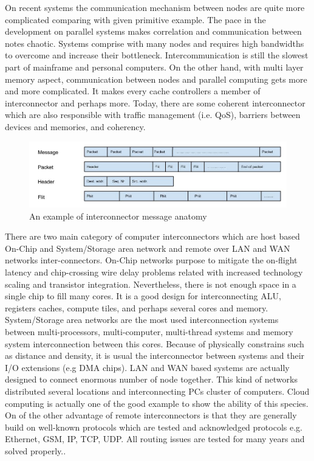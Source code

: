             On recent systems the communication mechanism between nodes are quite more complicated comparing with given primitive example. The pace in the development on parallel systems makes correlation and communication between notes chaotic. Systems comprise with many nodes and requires high bandwidths  to overcome and increase their bottleneck. Intercommunication is still the slowest part of mainframe and personal computers. On the other hand, with multi layer memory aspect, communication between nodes and parallel computing gets more and more complicated. It makes every cache controllers a member of interconnector and perhaps  more. Today, there are some coherent interconnector which are also responsible with traffic management (i.e. QoS), barriers between devices and memories, and coherency\cite{armcoherentinterconnector}.

            \begin{figure}[h!]
                \centering
                \includegraphics[width=1\textwidth]{img/Message_Anatomy.jpg}
                \caption{An example of interconnector message anatomy }
                \label{fig:message_anatomy}
            \end{figure}

            There are two main category of computer interconnectors which are host based On-Chip and System/Storage area network and remote over LAN and WAN networks inter-connectors. On-Chip networks purpose to mitigate the on-flight latency and chip-crossing wire delay problems related with increased technology scaling and transistor integration. Nevertheless, there is not enough space in a single chip to fill many cores. It is a good design for interconnecting ALU, registers caches, compute tiles, and perhaps several cores and memory. System/Storage area networks are the most used interconnection systems between multi-processors, multi-computer, multi-thread systems and memory system interconnection between this cores. Because of physically constrains such as distance and density, it is usual the interconnector between systems and their I/O extensions (e.g DMA chips). LAN and WAN based systems are actually designed to connect enormous number of node together. This kind of networks distributed several locations and interconnecting PCs cluster of computers. Cloud computing is actually one of the good example to show the ability of this species. On of the other advantage of remote interconnectors is that they are generally build on well-known protocols which are tested and acknowledged protocols e.g. Ethernet, GSM, IP, TCP, UDP. All routing issues are tested for many years and solved properly.\cite{hennessy2012computer}.

